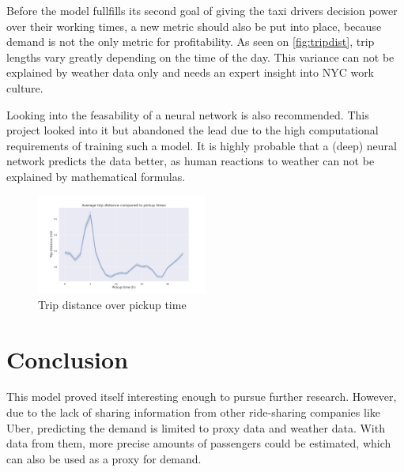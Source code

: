 \documentclass[11pt]{article}
\begin{document}
Before the model fullfills its second goal of giving the taxi drivers decision power over their working times, a new metric should also be put into place, because demand is not the only metric for profitability. As seen on \autoref{fig:tripdist}, trip lengths vary greatly depending on the time of the day. This variance can not be explained by weather data only and needs an expert insight into NYC work culture.

Looking into the feasability of a neural network is also recommended. This project looked into it but abandoned the lead due to the high computational requirements of training such a model. It is highly probable that a (deep) neural network predicts the data better, as human reactions to weather can not be explained by mathematical formulas.



\begin{figure}[h]
    \includegraphics[width=0.5\textwidth]{pickuptime_distance.jpeg}
    \centering
    \caption{Trip distance over pickup time} \label{fig:tripdist}%
\end{figure}

\section{Conclusion}

This model proved itself interesting enough to pursue further research. However, due to the lack of sharing information from other ride-sharing companies like Uber, predicting the demand is limited to proxy data and weather data. With data from them, more precise amounts of passengers could be estimated, which can also be used as a proxy for demand.


\clearpage

\printbibliography
\end{document}
